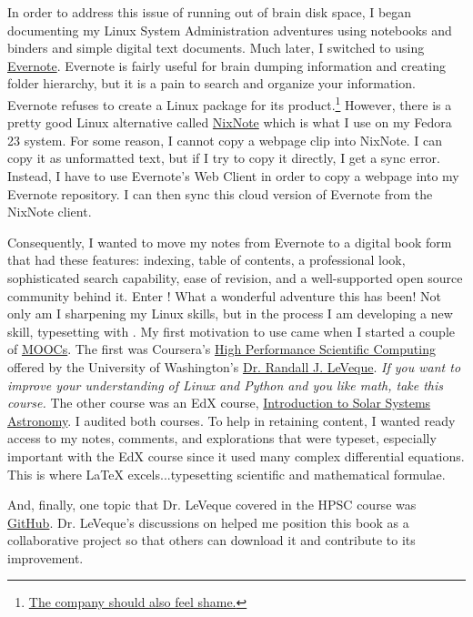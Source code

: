 In order to address this issue of running out of brain disk space, I began documenting my Linux System Administration adventures using notebooks and binders and simple digital text documents. Much later, I switched to using \href{https://evernote.com}{Evernote}. Evernote is fairly useful for brain dumping information and creating folder hierarchy, but it is a pain to search and organize your information. Evernote refuses to create a Linux package for its product.\footnote{\href{https://www.youtube.com/watch?v=eGKdle1bbvo}{The company should also feel shame.}} However, there is a pretty good Linux alternative called \href{http://sourceforge.net/projects/nevernote/}{NixNote} which is what I use on my Fedora 23 system. For some reason, I cannot copy a webpage clip into NixNote. I can copy it as unformatted text, but if I try to copy it directly, I get a sync error. Instead, I have to use Evernote's Web Client in order to copy a webpage into my Evernote repository. I can then sync this cloud version of Evernote from the NixNote client.

Consequently, I wanted to move my notes from Evernote to a digital book form that had these features: indexing, table of contents, a professional look, sophisticated search capability, ease of revision, and a well-supported open source community behind it. Enter \latex! What a wonderful adventure this has been! Not only am I sharpening my Linux skills, but in the process I am developing a new skill, typesetting with \latex. My first motivation to use \latex came when I started a couple of \href{https://en.wikipedia.org/wiki/Massive\_open\_online\_course}{MOOCs}. The first was Coursera's \href{https://www.coursera.org/course/scicomp}{High Performance Scientific Computing} offered by the University of Washington's \href{http://faculty.washington.edu/rjl/}{Dr. Randall J. LeVeque}. \textit{If you want to improve your understanding of Linux and Python and you like math, take this course.} The other course was an EdX course,  \href{https://www.edx.org/course/introduction-solar-systems-astronomy-asux-ast111x-0}{Introduction to Solar Systems Astronomy}. I audited both courses. To help in retaining content, I wanted ready access to my notes, comments, and explorations that were typeset, especially important with the EdX course since it used many complex differential equations. This is where LaTeX excels...typesetting scientific and mathematical formulae.

And, finally, one topic that Dr. LeVeque covered in the HPSC course was \href{https://github.com/}{GitHub}.  Dr. LeVeque's discussions on  helped me position this book as a collaborative project so that others can download it and contribute to its improvement.


